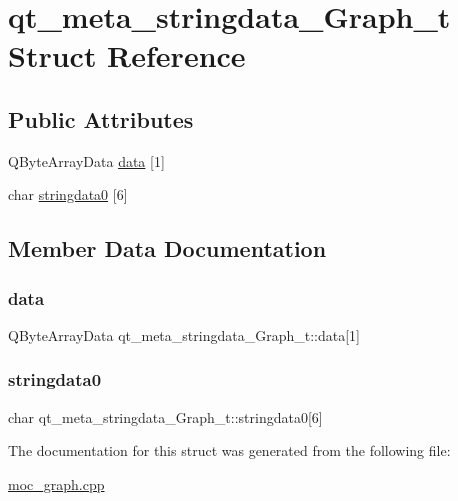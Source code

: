\hypertarget{structqt__meta__stringdata__Graph__t}{}\section{qt\+\_\+meta\+\_\+stringdata\+\_\+\+Graph\+\_\+t Struct Reference}
\label{structqt__meta__stringdata__Graph__t}
\subsection*{Public Attributes}
\begin{DoxyCompactItemize}
\item 
Q\+Byte\+Array\+Data \mbox{\hyperlink{structqt__meta__stringdata__Graph__t_aff7d29752d1049a0bfe163f507087d80}{data}} \mbox{[}1\mbox{]}
\item 
char \mbox{\hyperlink{structqt__meta__stringdata__Graph__t_aea9bd35f7744c0df44e99f457533c49f}{stringdata0}} \mbox{[}6\mbox{]}
\end{DoxyCompactItemize}


\subsection{Member Data Documentation}
\mbox{\label{structqt__meta__stringdata__Graph__t_aff7d29752d1049a0bfe163f507087d80}} 
\subsubsection{\texorpdfstring{data}{data}}
{\footnotesize\ttfamily Q\+Byte\+Array\+Data qt\+\_\+meta\+\_\+stringdata\+\_\+\+Graph\+\_\+t\+::data\mbox{[}1\mbox{]}}

\mbox{\label{structqt__meta__stringdata__Graph__t_aea9bd35f7744c0df44e99f457533c49f}} 
\subsubsection{\texorpdfstring{stringdata0}{stringdata0}}
{\footnotesize\ttfamily char qt\+\_\+meta\+\_\+stringdata\+\_\+\+Graph\+\_\+t\+::stringdata0\mbox{[}6\mbox{]}}



The documentation for this struct was generated from the following file\+:\begin{DoxyCompactItemize}
\item 
\mbox{\hyperlink{moc__graph_8cpp}{moc\+\_\+graph.\+cpp}}\end{DoxyCompactItemize}

